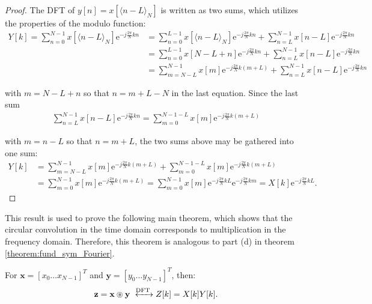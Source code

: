 \begin{proof}
The DFT of $y[n] = x[\langle n-L\rangle_N]$ is written as two sums, which utilizes the properties of the modulo function:
\begin{align*}
Y[k] = \sum_{n=0}^{N-1} x[\langle n-L\rangle_N] \text{e}^{-j\frac{2\pi}{N} kn} &= \sum_{n=0}^{L-1} x[\langle n-L\rangle_N]\text{e}^{-j\frac{2\pi}{N} kn} + \sum_{n=L}^{N-1} x[n-L]\text{e}^{-j\frac{2\pi}{N} kn} \\
&= \sum_{n=0}^{L-1} x[N-L+n]\text{e}^{-j\frac{2\pi}{N} kn} + \sum_{n=L}^{N-1} x[n-L]\text{e}^{-j\frac{2\pi}{N} kn} \\
&= \sum_{m=N-L}^{N-1} x[m]\text{e}^{-j\frac{2\pi}{N} k(m+L)} + \sum_{n=L}^{N-1} x[n-L]\text{e}^{-j\frac{2\pi}{N} kn}
\end{align*}

with $m = N - L + n$ so that $n = m + L - N$ in the last equation. Since the last sum
\begin{align*}
\sum_{n=L}^{N-1} x[n-L]\text{e}^{-j\frac{2\pi}{N} kn} = \sum_{m=0}^{N-1-L} x[m] \text{e}^{-j\frac{2\pi}{N}k(m+L)}
\end{align*}

with $m = n - L$ so that $n = m + L$, the two sums above may be gathered into one sum:
\begin{align*}
Y[k] &= \sum_{m=N-L}^{N-1} x[m]\text{e}^{-j\frac{2\pi}{N} k(m+L)} + \sum_{m=0}^{N-1-L} x[m] \text{e}^{-j\frac{2\pi}{N}k(m+L)}  \\
&= \sum_{m=0}^{N-1} x[m] \text{e}^{-j\frac{2\pi}{N}k(m+L)} = \sum_{m=0}^{N-1} x[m] \text{e}^{-j\frac{2\pi}{N}kL}\text{e}^{-j\frac{2\pi}{N}km} = X[k] \text{e}^{-j\frac{2\pi}{N}kL}.
\end{align*}
\end{proof}

This result is used to prove the following main theorem, which shows that the circular convolution in the time domain corresponds to multiplication in the frequency domain. Therefore, this theorem is analogous to part (d) in theorem \ref{theorem:fund_sym_Fourier}.

\begin{theorem}
For $\textbf{x} = [x_0 \dots x_{N-1}]^T$ and $\textbf{y} = [y_0 \dots y_{N-1}]^T$, then:
\begin{align*}
\textbf{z} = \textbf{x} \circledast \textbf{y} \xleftrightarrow{\text{DFT}} Z[k] = X[k] Y[k].
\end{align*}
\end{theorem}

